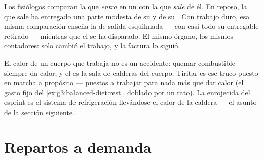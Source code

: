 \begin{example}\label{ex:g7:organs-at-work:measure}
Los fisiólogos comparan la  que \emph{entra} en un  con la
que \emph{sale} de él. En reposo, la  que sale ha entregado una
parte modesta de su  y de su . Con trabajo duro, esa
misma comparación enseña la  de salida esquilmada --- con casi
todo su  entregable retirado --- mientras que el  se ha disparado. El mismo órgano, los mismos contadores: solo
cambió el trabajo, y la factura lo siguió.
\end{example}

\begin{remark}\label{rem:g7:organs-at-work:warmth}
El calor de un cuerpo que trabaja no es un accidente: quemar
combustible siempre da calor, y el  es la sala de calderas del
cuerpo. Tiritar es ese truco puesto en marcha a propósito --- 
puestos a trabajar para nada más que dar calor (el gasto fijo del
\cref{ex:g3:balanced-diet:rest}, doblado por un rato). La 
enrojecida del esprint es el sistema de refrigeración llevándose el
calor de la caldera --- el asunto de la sección siguiente.
\end{remark}

\section{Repartos a demanda}

